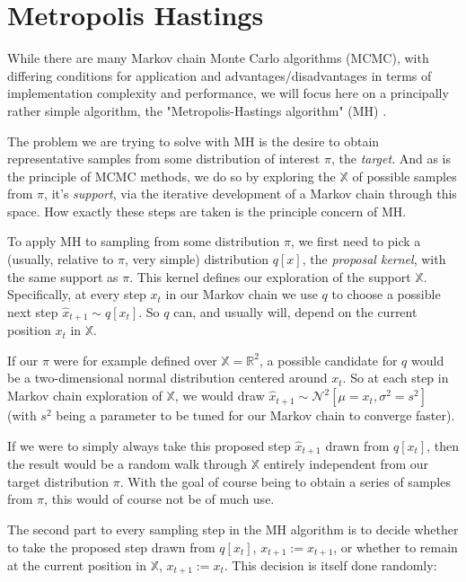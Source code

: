\section{Metropolis Hastings}

While there are many Markov chain Monte Carlo algorithms (MCMC), with differing conditions for application and advantages/disadvantages in terms of implementation complexity and performance, we will focus here on a principally rather simple algorithm, the "Metropolis-Hastings algorithm" (MH) \cite{metropolis1953equation} \cite{hastings1970monte}.

The problem we are trying to solve with MH is the desire to obtain representative samples from some distribution of interest $\pi$, the \textit{target}. And as is the principle of MCMC methods, we do so by exploring the $\mathbb{X}$ of possible samples from $\pi$, it's \textit{support}, via the iterative development of a Markov chain through this space. How exactly these steps are taken is the principle concern of MH.

To apply MH to sampling from some distribution $\pi$, we first need to pick a (usually, relative to $\pi$, very simple) distribution $q[x]$, the \textit{proposal kernel}, with the same support as $\pi$. This kernel defines our exploration of the support $\mathbb{X}$. Specifically, at every step $x_t$ in our Markov chain we use $q$ to choose a possible next step $\hat{x}_{t+1} \sim q[x_t]$. So $q$ can, and usually will, depend on the current position $x_t$ in $\mathbb{X}$.

If our $\pi$ were for example defined over $\mathbb{X} = \mathbb{R}^2$, a possible candidate for $q$ would be a two-dimensional normal distribution centered around $x_t$. So at each step in Markov chain exploration of $\mathbb{X}$, we would draw $\hat{x}_{t+1} \sim \mathcal{N}^2[\mu = x_t, \sigma^2 = s^2]$ (with $s^2$ being a parameter to be tuned for our Markov chain to converge faster).

If we were to simply always take this proposed step $\hat{x}_{t+1}$ drawn from $q[x_t]$, then the result would be a random walk through $\mathbb{X}$ entirely independent from our target distribution $\pi$. With the goal of course being to obtain a series of samples from $\pi$, this would of course not be of much use.

The second part to every sampling step in the MH algorithm is to decide whether to take the proposed step drawn from $q[x_t]$, $x_{t+1} := \hat{x}_{t+1}$, or whether to remain at the current position in $\mathbb{X}$, $x_{t+1} := x_t$. This decision is itself done randomly:

